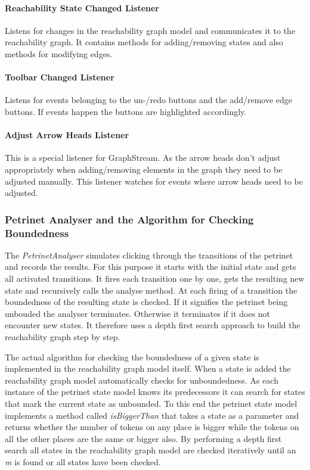 \documentclass[10pt, a4paper]{article}
\begin{document}
\paragraph{Reachability State Changed Listener} Listens for changes in the reachability graph model and communicates it to the reachability graph. It contains methods for adding/removing states and also methods for modifying edges.
\paragraph{Toolbar Changed Listener} Listens for events belonging to the un-/redo buttons and the add/remove edge buttons. If events happen the buttons are highlighted accordingly.
\paragraph{Adjust Arrow Heads Listener} This is a special listener for GraphStream. As the arrow heads don't adjust appropriately when adding/removing elements in the graph they need to be adjusted manually. This listener watches for events where arrow heads need to be adjusted.

\subsubsection{Petrinet Analyser and the Algorithm for Checking Boundedness}
\label{label:algorithm}





The \textit{PetrinetAnalyser} simulates clicking through the transitions of the petrinet and records the results. For this purpose it starts with the initial state and gets all activated transitions. It fires each transition one by one, gets the resulting new state and recursively calls the analyse method. At each firing of a transition the boundedness of the resulting state is checked. If it signifies the petrinet being unbouded the analyser terminates. Otherwise it terminates if it does not encounter new states. It therefore uses a depth first search approach to build the reachability graph step by step.

The actual algorithm for checking the boundedness of a given state is implemented in the reachability graph model itself. When a state is added the reachability graph model automatically checks for unboundedness. As each instance of the petrinet state model knows its predecessors it can search for states that mark the current state as unbounded. To this end the petrinet state model implements a method called \textit{isBiggerThan} that takes a state as a parameter and returns whether the number of tokens on any place is bigger while the tokens on all the other places are the same or bigger also. By performing a depth first search all states in the reachability graph model are checked iteratively until an \textit{m} is found or all states have been checked.
\end{document}
